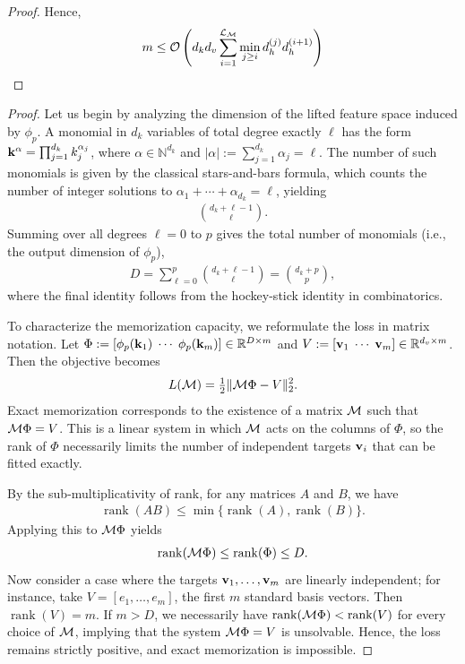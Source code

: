 \begin{proof}
Hence,
\begin{align*}
m \le \mathcal{O}\left( d_k d_v \sum_{i=1}^{\mathcal{L}_{\mathcal{M}}} \min_{j \ge i} d_h^{(j)} d_h^{(i+1)} \right)
\end{align*}
\end{proof}
\PolyCapacity*
\begin{proof}
Let us begin by analyzing the dimension of the lifted feature space induced by $\phi_p$. A monomial in $d_k$ variables of total degree exactly $\ell$ has the form $\mathbf{k}^\alpha = \prod_{j=1}^{d_k} k_j^{\alpha_j}$, where $\alpha \in \mathbb{N}^{d_k}$ and $|\alpha| := \sum_{j=1}^{d_k} \alpha_j = \ell$. The number of such monomials is given by the classical stars-and-bars formula, which counts the number of integer solutions to $\alpha_1 + \cdots + \alpha_{d_k} = \ell$, yielding
\begin{align*}
  \binom{d_k + \ell - 1}{\ell}.
\end{align*}
Summing over all degrees $\ell = 0$ to $p$ gives the total number of monomials (i.e., the output dimension of $\phi_p$),
\begin{align*}
  D = \sum_{\ell=0}^p \binom{d_k + \ell - 1}{\ell} = \binom{d_k + p}{p},
\end{align*}
where the final identity follows from the hockey-stick identity in combinatorics.

To characterize the memorization capacity, we reformulate the loss in matrix notation. Let $\Phi := [\phi_p(\mathbf{k}_1)\;\cdots\;\phi_p(\mathbf{k}_m)] \in \mathbb{R}^{D \times m}$ and $V := [\mathbf{v}_1\;\cdots\;\mathbf{v}_m] \in \mathbb{R}^{d_v \times m}$. Then the objective becomes
\begin{align*}
  L(\mathcal{M}) = \tfrac{1}{2} \|\mathcal{M} \Phi - V\|_2^2.
\end{align*}
Exact memorization corresponds to the existence of a matrix $\mathcal{M}$ such that $\mathcal{M} \Phi = V$. This is a linear system in which $\mathcal{M}$ acts on the columns of $\Phi$, so the rank of $\Phi$ necessarily limits the number of independent targets $\mathbf{v}_i$ that can be fitted exactly.

By the sub-multiplicativity of rank, for any matrices $A$ and $B$, we have
\begin{align*}
  \operatorname{rank}(AB) \le \min\{\operatorname{rank}(A), \operatorname{rank}(B)\}.
\end{align*}
Applying this to $\mathcal{M} \Phi$ yields
\begin{align*}
  \operatorname{rank}(\mathcal{M} \Phi) \le \operatorname{rank}(\Phi) \le D.
\end{align*}
Now consider a case where the targets $\mathbf{v}_1, \dots, \mathbf{v}_m$ are linearly independent; for instance, take $V = [e_1, \dots, e_m]$, the first $m$ standard basis vectors. Then $\operatorname{rank}(V) = m$. If $m > D$, we necessarily have $\operatorname{rank}(\mathcal{M} \Phi) < \operatorname{rank}(V)$ for every choice of $\mathcal{M}$, implying that the system $\mathcal{M} \Phi = V$ is unsolvable. Hence, the loss remains strictly positive, and exact memorization is impossible.


\end{proof}
